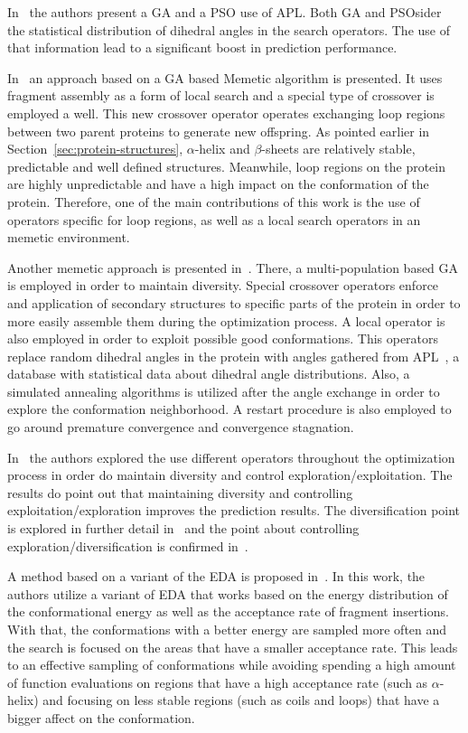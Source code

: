 In~\cite{borguesan2015apl} the authors present a \ac{GA} and a \ac{PSO} use
of \ac{APL}. Both \ac{GA} and \ac{PSO}sider the statistical distribution of
dihedral angles in the search operators. The use of that information lead to a
significant boost in prediction performance.

In~\cite{garza2016generating} an approach based on a GA based Memetic algorithm
is presented. It uses fragment assembly as a form of local search and a special
type of crossover is employed a well. This new crossover operator operates
exchanging loop regions between two parent proteins to generate new offspring.
As pointed earlier in Section~\ref{sec:protein-structures}, $\alpha$-helix and
$\beta$-sheets are relatively stable, predictable and well defined structures.
Meanwhile, loop regions on the protein are highly unpredictable and have a high
impact on the conformation of the protein. Therefore, one of the main
contributions of this work is the use of operators specific for loop regions,
as well as a local search operators in an memetic environment.

Another memetic approach is presented in~\cite{correa2016memetic}. There, a multi-population
based \ac{GA} is employed in order to maintain diversity. Special crossover operators enforce
and application of secondary structures to specific parts of the protein in order
to more easily assemble them during the optimization process. A local operator is
also employed in order to exploit possible good conformations. This operators
replace random dihedral angles in the protein with angles gathered from
\ac{APL}~\cite{borguesan2015apl}, a database with statistical data about dihedral angle
distributions. Also, a simulated annealing algorithms is utilized after the angle
exchange in order to explore the conformation neighborhood. A restart procedure is also
employed to go around premature convergence and convergence stagnation.

In~\cite{narloch2017protein} the authors explored the use different operators
throughout the optimization process in order do maintain diversity and control
exploration/exploitation. The results do point out that maintaining diversity
and controlling exploitation/exploration improves the prediction results.
The diversification point is explored in further detail in~\cite{narloch2016diversification}
and the point about controlling exploration/diversification is confirmed
in~\cite{simoncini2017balancing}.

A method based on a variant of the \ac{EDA} is proposed in~\cite{hao2017double}. In
this work, the authors utilize a variant of \ac{EDA} that works based on the energy
distribution of the conformational energy as well as the acceptance rate of fragment
insertions. With that, the conformations with a better energy are sampled more often
and the search is focused on the areas that have a smaller acceptance rate. This
leads to an effective sampling of conformations while avoiding spending a high
amount of function evaluations on regions that have a high acceptance rate (such
as $\alpha$-helix) and focusing on less stable regions (such as coils and loops)
that have a bigger affect on the conformation.


